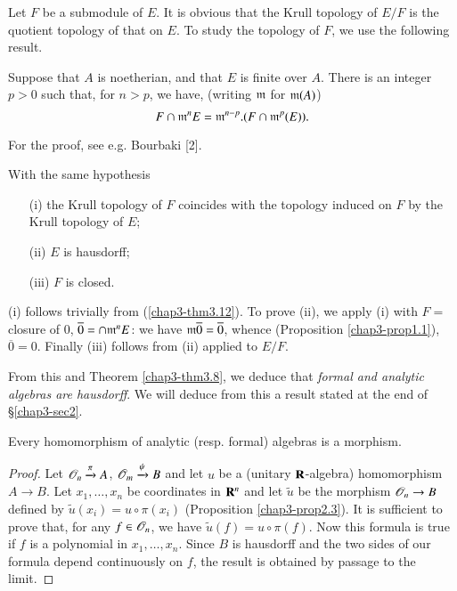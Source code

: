 Let $F$ be a submodule of $E$. It is obvious that the Krull topology of $E/F$ is the quotient topology of that on $E$. To study the topology of $F$, we use the following result.

\begin{theorem}\label{chap3-thm3.12}
Suppose that $A$ is noetherian, and that $E$ is finite over $A$. There is an integer $p>0$ such that, for $n>p$, we have, (writing $\mathfrak{m}$ for $\mathfrak{m}(A)$)
$$
F\cap \mathfrak{m}^{n}E=\mathfrak{m}^{n-p}.(F\cap \mathfrak{m}^{p}(E)).
$$
\end{theorem}

For the proof, see e.g. Bourbaki [2].
\begin{corollary}[Krull]\label{chap3-coro3.13}
With the same hypothesis
\begin{itemize}
\item[\rm(i)] the Krull topology of $F$ coincides with the topology induced on $F$ by the Krull topology of $E$;

\item[\rm(ii)] $E$ is hausdorff;

\item[\rm(iii)] $F$ is closed.
\end{itemize}
\end{corollary}
(i) follows trivially from (\ref{chap3-thm3.12}). To prove (ii), we apply (i) with $F=$ closure of $0$, $\overline{0}=\cap \mathfrak{m}^{n}E$: we have $\mathfrak{m}\overline{0}=\overline{0}$, whence (Proposition \ref{chap3-prop1.1}), $\overline{0}=0$. Finally (iii) follows from (ii) applied to $E/F$.

From this and Theorem \ref{chap3-thm3.8}, we deduce that {\em formal and analytic algebras are hausdorff}. We will deduce from this a result stated at the end of \S\ref{chap3-sec2}.

\begin{proposition}\label{chap3-prop3.14}
Every homomorphism of analytic (resp. formal) algebras is a morphism.
\end{proposition}

\begin{proof}
Let $\mathscr{O}_{n}\xrightarrow{\pi}A$, $\mathscr{O}_{m}\xrightarrow{\psi}B$ and let $u$ be a (unitary $\mathbf{R}$-algebra) homomorphism $A\to B$. Let $x_{1},\ldots,x_{n}$ be coordinates in $\mathbf{R}^{n}$ and let $\widetilde{u}$ be the morphism $\mathscr{O}_{n}\to B$ defined by $\widetilde{u}(x_{i})=u\circ \pi(x_{i})$ (Proposition \ref{chap3-prop2.3}). It is sufficient to prove that, for any $f\in \mathscr{O}_{n}$, we have $\widetilde{u}(f)=u\circ \pi(f)$. Now this formula is true if $f$ is a polynomial in $x_{1},\ldots,x_{n}$. Since $B$ is hausdorff and the two sides of our formula depend continuously on $f$, the result is obtained by passage to the limit.
\end{proof}

